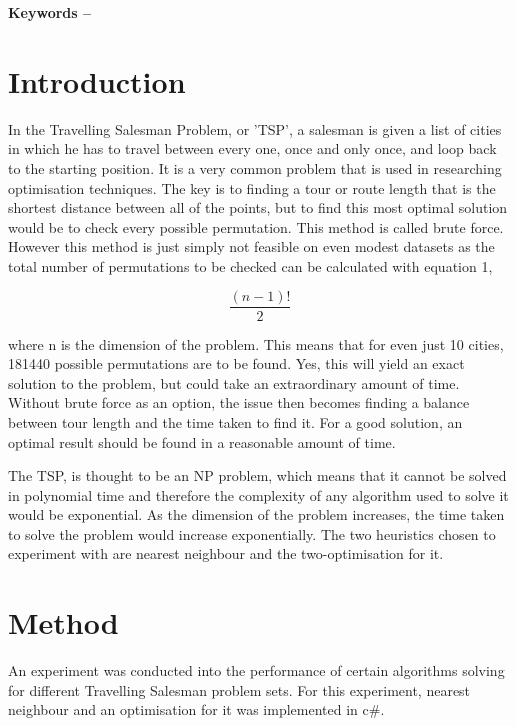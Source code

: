 \documentclass[10pt, a4paper]{article}
\title{\mytitle}
\author{\myauthor\hspace{1em}\\\contact\\Edinburgh Napier University\hspace{0.5em}-\hspace{0.5em}\mymodule}
\date{}
\begin{document}
	\maketitle
    
	\textbf{Keywords -- }{\mykeywords}
    
	\section{Introduction}
	
	In the Travelling Salesman Problem, or 'TSP', a salesman is given a list of cities in which he has to travel between every one, once and only once, and loop back to the starting position. It is a very common problem that is used in researching optimisation techniques. The key is to finding a tour or route length that is the shortest distance between all of the points, but to find this most optimal solution would be to check every possible permutation. This method is called brute force.\cite{brute} However this method is just simply not feasible on even modest datasets as the total number of permutations to be checked can be calculated with equation 1,
	
	\begin{equation}
	\frac{(n-1)!}{2}
	\end{equation}
	
	where n is the dimension of the problem. This means that for even just 10 cities, 181440 possible permutations are to be found. Yes, this will yield an exact solution to the problem, but could take an extraordinary amount of time. Without brute force as an option, the issue then becomes finding a balance between tour length and the time taken to find it. For a good solution, an optimal result should be found in a reasonable amount of time.
	
	The TSP, is thought to be an NP problem, which means that it cannot be solved in polynomial time and therefore the complexity of any algorithm used to solve it would be exponential. \cite{np} As the dimension of the problem increases, the time taken to solve the problem would increase exponentially. The two heuristics chosen to experiment with are nearest neighbour and the two-optimisation for it.
		
	\section{Method}
	An experiment was conducted into the performance of certain algorithms solving for different Travelling Salesman problem sets. For this experiment, nearest neighbour and an optimisation for it was implemented in c$\#$. 
	
\end{document}
